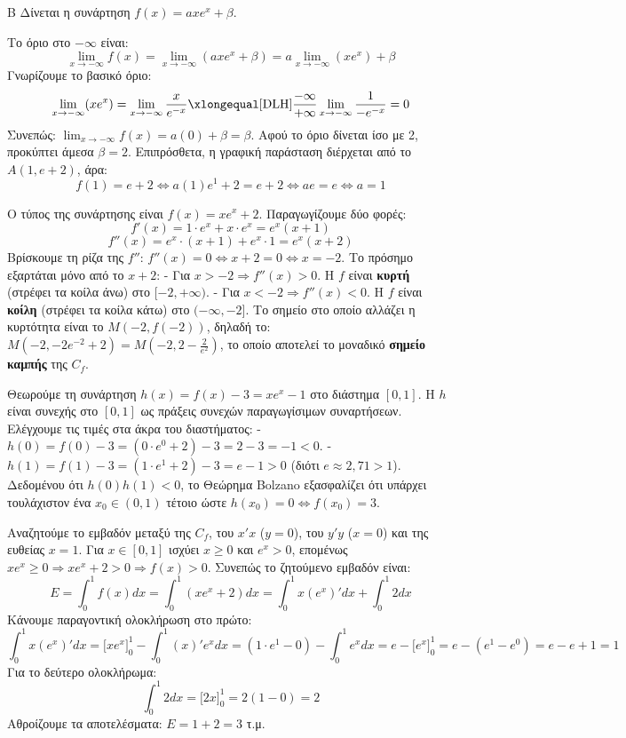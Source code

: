 
\begin{thema}{Β}
Δίνεται η συνάρτηση $f(x) = a x e^x + \beta$.
\begin{erwthma}
\item Το όριο στο $-\infty$ είναι:
\[ \lim_{x\to-\infty} f(x) = \lim_{x\to-\infty} (a x e^x + \beta) = a \lim_{x\to-\infty} (x e^x) + \beta \]
Γνωρίζουμε το βασικό όριο:
\[ \lim_{x\to-\infty} (x e^x) = \lim_{x\to-\infty} \frac{x}{e^{-x}} \xlongequal[\text{DLH}]{\frac{-\infty}{+\infty}} \lim_{x\to-\infty} \frac{1}{-e^{-x}} = 0 \]
Συνεπώς: $\lim_{x\to-\infty} f(x) = a (0) + \beta = \beta$. 
Αφού το όριο δίνεται ίσο με 2, προκύπτει άμεσα $\beta = 2$.
Επιπρόσθετα, η γραφική παράσταση διέρχεται από το $A(1, e+2)$, άρα:
\[ f(1) = e+2 \Leftrightarrow a(1)e^1 + 2 = e + 2 \Leftrightarrow ae = e \Leftrightarrow a = 1 \]

\item Ο τύπος της συνάρτησης είναι $f(x) = x e^x + 2$. Παραγωγίζουμε δύο φορές:
\[ f'(x) = 1\cdot e^x + x \cdot e^x = e^x(x+1) \]
\[ f''(x) = e^x \cdot (x+1) + e^x \cdot 1 = e^x(x+2) \]
Βρίσκουμε τη ρίζα της $f''$: $f''(x) = 0 \Leftrightarrow x+2 = 0 \Leftrightarrow x = -2$.
Το πρόσημο εξαρτάται μόνο από το $x+2$:
- Για $x > -2 \Rightarrow f''(x) > 0$. Η $f$ είναι \textbf{κυρτή} (στρέφει τα κοίλα άνω) στο $[-2, +\infty)$.
- Για $x < -2 \Rightarrow f''(x) < 0$. Η $f$ είναι \textbf{κοίλη} (στρέφει τα κοίλα κάτω) στο $(-\infty, -2]$.
Το σημείο στο οποίο αλλάζει η κυρτότητα είναι το $M(-2, f(-2))$, δηλαδή το:
$M\left(-2, -2e^{-2}+2\right) = M\left(-2, 2-\frac{2}{e^2}\right)$, το οποίο αποτελεί το μοναδικό \textbf{σημείο καμπής} της $C_f$.

\item Θεωρούμε τη συνάρτηση $h(x) = f(x) - 3 = x e^x - 1$ στο διάστημα $[0, 1]$.
Η $h$ είναι συνεχής στο $[0, 1]$ ως πράξεις συνεχών παραγωγίσιμων συναρτήσεων.
Ελέγχουμε τις τιμές στα άκρα του διαστήματος:
- $h(0) = f(0) - 3 = (0\cdot e^0 + 2) - 3 = 2 - 3 = -1 < 0$.
- $h(1) = f(1) - 3 = (1\cdot e^1 + 2) - 3 = e - 1 > 0$ (διότι $e \approx 2,71 > 1$).
Δεδομένου ότι $h(0)h(1) < 0$, το Θεώρημα Bolzano εξασφαλίζει ότι υπάρχει τουλάχιστον ένα $x_0 \in (0, 1)$ τέτοιο ώστε $h(x_0)=0 \Leftrightarrow f(x_0)=3$.

\item Αναζητούμε το εμβαδόν μεταξύ της $C_f$, του $x'x$ ($y=0$), του $y'y$ ($x=0$) και της ευθείας $x=1$.
Για $x \in [0, 1]$ ισχύει $x \ge 0$ και $e^x > 0$, επομένως $x e^x \ge 0 \Rightarrow x e^x + 2 > 0 \Rightarrow f(x) > 0$.
Συνεπώς το ζητούμενο εμβαδόν είναι:
\[ E = \int_0^1 f(x) dx = \int_0^1 (x e^x + 2) dx = \int_0^1 x (e^x)' dx + \int_0^1 2 dx \]
Κάνουμε παραγοντική ολοκλήρωση στο πρώτο:
\[ \int_0^1 x(e^x)' dx = \Big[ x e^x \Big]_0^1 - \int_0^1 (x)' e^x dx = (1\cdot e^1 - 0) - \int_0^1 e^x dx = e - \Big[ e^x \Big]_0^1 = e - (e^1 - e^0) = e - e + 1 = 1 \]
Για το δεύτερο ολοκλήρωμα:
\[ \int_0^1 2 dx = \Big[ 2x \Big]_0^1 = 2(1 - 0) = 2 \]
Αθροίζουμε τα αποτελέσματα: $E = 1 + 2 = 3$ τ.μ.
\end{erwthma}
\end{thema}

